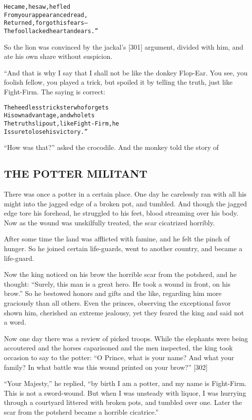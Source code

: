 \documentclass{article}
\renewenvironment{verbatim}{\begin{alltt}\normalfont\begin{centering}}{\end{centering}\end{alltt}}
\begin{document}
\begin{verbatim}
He came, he saw, he fled
From your appearance dread,
Returned, forgot his fears--
The fool lacked heart and ears.”
\end{verbatim}
So the lion was convinced by the jackal's [301] argument, divided
with him, and ate his own share without suspicion.

“And that is why I say that I shall not be like the donkey
Flop-Ear. You see, you foolish fellow, you played a trick, but
spoiled it by telling the truth, just like Fight-Firm. The saying
is correct:

\begin{verbatim}
The heedless trickster who forgets
His own advantage, and who lets
The truth slip out, like Fight-Firm, he
Is sure to lose his victory.”
\end{verbatim}
``How was that?'' asked the crocodile. And the monkey told the
story of

\subsection{THE POTTER MILITANT}

There was once a potter in a certain place. One day he carelessly
ran with all his might into the jagged edge of a broken pot, and
tumbled. And though the jagged edge tore his forehead, he struggled
to his feet, blood streaming over his body. Now as the wound was
unskilfully treated, the scar cicatrized horribly.

After some time the land was afflicted with famine, and he felt the
pinch of hunger. So he joined certain life-guards, went to another
country, and became a life-guard.

Now the king noticed on his brow the horrible scar from the
potsherd, and he thought:
``Surely, this man is a great hero. He took a wound in front, on his brow.''
So he bestowed honors and gifts and the like, regarding him more
graciously than all others. Even the princes, observing the
exceptional favor shown him, cherished an extreme jealousy, yet
they feared the king and said not a word.

Now one day there was a review of picked troops. While the
elephants were being accoutered and the horses caparisoned and the
men inspected, the king took occasion to say to the potter:
``O Prince, what is your name? And what your family? In what battle was this wound printed on your brow?''
[302]

``Your Majesty,'' he replied,
``by birth I am a potter, and my name is Fight-Firm. This is not a sword-wound. But when I was unsteady with liquor, I was hurrying through a courtyard littered with broken pots, and tumbled over one. Later the scar from the potsherd became a horrible cicatrice.''
\end{document}
